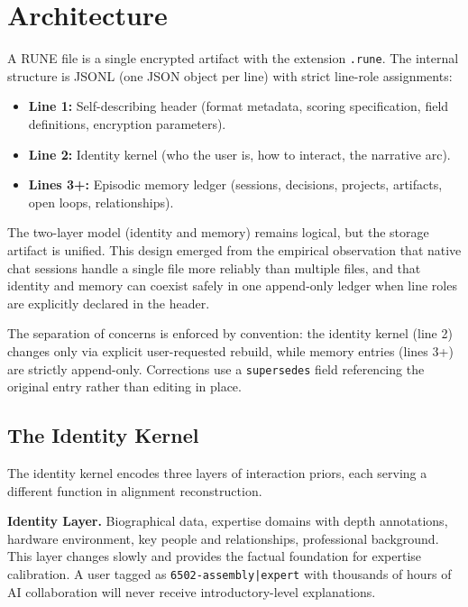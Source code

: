 \documentclass[11pt,a4paper]{article}
\begin{document}
\section{Architecture}

A RUNE file is a single encrypted artifact with the extension \texttt{.rune}. The internal structure is JSONL (one JSON object per line) with strict line-role assignments:

\begin{itemize}
    \item \textbf{Line 1:} Self-describing header (format metadata, scoring specification, field definitions, encryption parameters).
    \item \textbf{Line 2:} Identity kernel (who the user is, how to interact, the narrative arc).
    \item \textbf{Lines 3+:} Episodic memory ledger (sessions, decisions, projects, artifacts, open loops, relationships).
\end{itemize}

The two-layer model (identity and memory) remains logical, but the storage artifact is unified. This design emerged from the empirical observation that native chat sessions handle a single file more reliably than multiple files, and that identity and memory can coexist safely in one append-only ledger when line roles are explicitly declared in the header.

The separation of concerns is enforced by convention: the identity kernel (line 2) changes only via explicit user-requested rebuild, while memory entries (lines 3+) are strictly append-only. Corrections use a \texttt{supersedes} field referencing the original entry rather than editing in place.

\subsection{The Identity Kernel}

The identity kernel encodes three layers of interaction priors, each serving a different function in alignment reconstruction.

\textbf{Identity Layer.} Biographical data, expertise domains with depth annotations, hardware environment, key people and relationships, professional background. This layer changes slowly and provides the factual foundation for expertise calibration. A user tagged as \texttt{6502-assembly|expert} with thousands of hours of AI collaboration will never receive introductory-level explanations.
\end{document}
